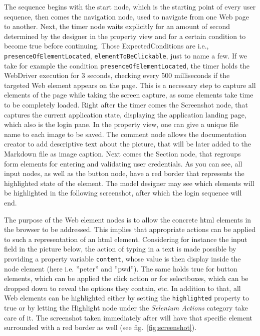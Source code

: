 The sequence begins with the start node, which is the starting point of every user sequence, then comes the navigation node, used to navigate from one Web page to another. Next, the timer node waits explicitly for an amount of second  determined by the designer in the property view and for a certain condition to become true before continuing. Those ExpectedConditions are i.e., \lstinline{presenceOfElementLocated}, \lstinline{elementToBeClickable}, just to name a few. If we take for example the condition \lstinline{presenceOfElementLocated}, the timer holds the WebDriver execution for 3 seconds, checking every 500 milliseconds if the targeted Web element appears on the page. This is a necessary step to capture all elements of the page while taking the screen capture, as some elements take time to be completely loaded. Right after the timer comes the Screenshot node, that captures the current application state, displaying the application landing page, which also is the login pane. In the property view, one can give a unique file name to each image to be saved. The comment node allows the documentation creator to add descriptive text about the picture, that will be later added to the Markdown file as image caption. Next comes the Section node, that regroups form elements for entering and validating user credentials. As you can see, all input nodes, as well as the button node, have a red border that represents the highlighted state of the element. The model designer may see which elements will be highlighted in the following screenshot, after which the login sequence will end. 

The purpose of the Web element nodes is to allow the concrete \gls*{html} elements in the browser to be addressed. This implies that appropriate actions can be applied to such a representation of an \gls*{html} element. Considering for instance the input field in the picture below, the action of typing in a text is made possible by providing a property variable \lstinline{content}, whose value is then display inside the node element (here i.e. ''peter'' and ''pwd''). The same holds true for button elements, which can be applied the click action or for selectboxes, which can be dropped down to reveal the options they contain, etc. In addition to that, all Web elements can be highlighted either by setting the \lstinline{highlighted} property to true or by letting the Highlight node under the \textit{Selenium Actions} category take care of it. The screenshot taken immediately after will have that specific element surrounded with a red border as well (see fig.~\ref{fig:screenshot}).

